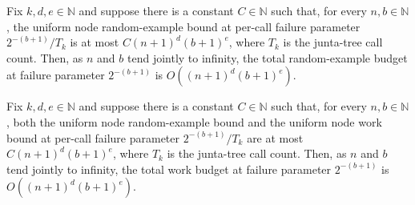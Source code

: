 \begin{theorem}
\label{FABL.lowDegreeJuntaTotalRandomExampleBudget_isBigO_of_polynomialWitness}
\leanok
{}
Fix $k,d,e\in\mathbb{N}$ and suppose there is a constant $C\in\mathbb{N}$ such that, for
every $n,b\in\mathbb{N}$, the uniform node random-example bound at per-call failure
parameter $2^{-(b+1)}/T_k$ is at most $C(n+1)^d(b+1)^e$, where $T_k$ is the junta-tree
call count. Then, as $n$ and $b$ tend jointly to infinity, the total random-example
budget at failure parameter $2^{-(b+1)}$ is $O\!\left((n+1)^d(b+1)^e\right)$.
\end{theorem}

\begin{theorem}
\label{FABL.lowDegreeJuntaTotalWorkBudget_isBigO_of_polynomialWitness}
\leanok
{}
Fix $k,d,e\in\mathbb{N}$ and suppose there is a constant $C\in\mathbb{N}$ such that, for
every $n,b\in\mathbb{N}$, both the uniform node random-example bound and the uniform
node work bound at per-call failure parameter $2^{-(b+1)}/T_k$ are at most
$C(n+1)^d(b+1)^e$, where $T_k$ is the junta-tree call count. Then, as $n$ and $b$ tend
jointly to infinity, the total work budget at failure parameter $2^{-(b+1)}$ is
$O\!\left((n+1)^d(b+1)^e\right)$.
\end{theorem}

